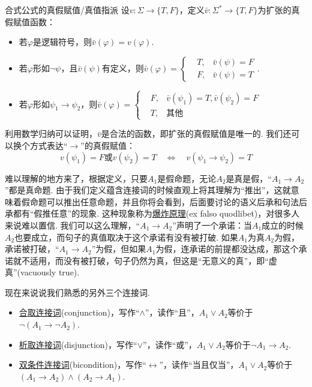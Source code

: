 \documentclass[main.tex]{subfiles}
\begin{document}
\begin{definition}{合式公式的真假赋值/真值指派}
    设\(v: \Sigma \to \{T,F\}\)，定义\(\bar v:\Sigma^* \to \{T,F\}\)为扩张的真假赋值函数：
    \begin{itemize}
        \item 若\(\varphi\)是逻辑符号，则\(\bar v(\varphi) = v(\varphi)\).
        \item 若\(\varphi\)形如\(\neg \psi\)，且\(\bar v(\psi)\)有定义，则\(\bar v(\varphi) = \left\{\begin{aligned} &T, & \bar v(\psi) = F \\ & F, & \bar v(\psi) = T \end{aligned}\right.\).
        \item 若\(\varphi\)形如\(\psi_1 \to \psi_2\)，则\(\bar v(\varphi) = \left\{\begin{aligned} &F, & \bar v(\psi_1) = T, \bar v(\psi_2) = F \\ & T, & \mbox{其他} \end{aligned}\right.\)
    \end{itemize}
\end{definition}

利用数学归纳可以证明，\(\bar v\)是合法的函数，即扩张的真假赋值是唯一的. 我们还可以换个方式表达“\(\to\)”的真假赋值：
\[v(\psi_1)=F\mbox{或}v(\psi_2)=T \quad \Longleftrightarrow \quad v(\psi_1 \to \psi_2)=T\]

\begin{note}
    难以理解的地方来了，根据定义，只要\(A_1\)是假命题，无论\(A_2\)是真是假，“\(A_1 \to A_2\)”都是真命题. 由于我们定义蕴含连接词的时候直观上将其理解为“推出”，这就意味着假命题可以推出任意命题，并且你将会看到，后面要讨论的语义后承和句法后承都有“假推任意”的现象. 这种现象称为\uline{爆炸原理}(ex falso quodlibet)，对很多人来说难以置信. 我们可以这么理解，“\(A_1 \to A_2\)”声明了一个承诺：当\(A_1\)成立的时候\(A_2\)也要成立，而句子的真值取决于这个承诺有没有被打破. 如果\(A_1\)为真\(A_2\)为假，承诺被打破，“\(A_1 \to A_2\)”为假，但如果\(A_1\)为假，连承诺的前提都没达成，那这个承诺就不适用，而没有被打破，句子仍然为真，但这是“无意义的真”，即“虚真”(vacuously true).
\end{note}

现在来说说我们熟悉的另外三个连接词.
\begin{itemize}
    \item \uline{合取连接词}(conjunction)，写作“\(\wedge\)”，读作“且”，\(A_1 \vee A_2\)等价于\(\neg (A_1 \to \neg A_2)\).
    \item \uline{析取连接词}(disjunction)，写作“\(\vee\)”，读作“或”，\(A_1 \vee A_2\)等价于\(\neg A_1 \to A_2\).
    \item \uline{双条件连接词}(bicondition)，写作“\(\leftrightarrow\)”，读作“当且仅当”，\(A_1 \vee A_2\)等价于\((A_1 \to A_2) \wedge (A_2 \to A_1)\).
\end{itemize}
\end{document}
